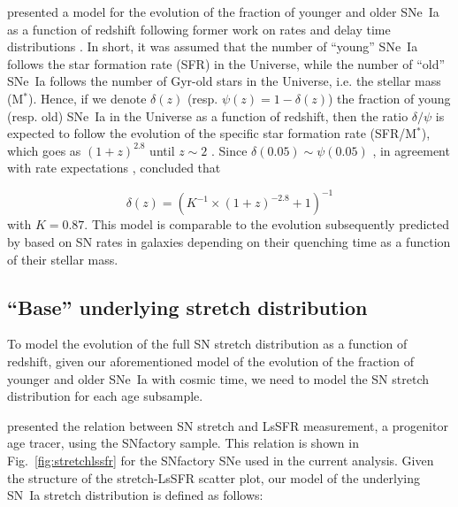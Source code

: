 \documentclass[]{aa}
\begin{document}
\cite{rigault2020} presented a model for the evolution of the fraction of
younger and older SNe~Ia as a function of redshift following former work on
rates and delay time distributions \citep[e.g.,][]{mannucci2005,
scannapieco2005, sullivan2006, aubourg2008, childress2014, maozmannucci2014}.
In short, it was assumed that the number of ``young'' SNe~Ia follows the star
formation rate (SFR) in the Universe, while the number of ``old'' SNe~Ia follows
the number of Gyr-old stars in the Universe, i.e. the stellar mass (M$^*$).
Hence, if we denote $\delta(z)$ (resp. $\psi(z) = 1-\delta(z)$) the fraction of
young (resp. old) SNe~Ia in the Universe as a function of redshift, then the
ratio $\delta/\psi$ is expected to follow the evolution of the specific star
formation rate (SFR/M$^*$), which goes as $(1+z)^{2.8}$ until $z\sim2$
\citep[e.g.,][]{tasca2015}. Since $\delta(0.05) \sim \psi(0.05)$
\citep{rigault2013, rigault2020, wiseman2020}, in agreement with rate
expectations \citep{mannucci2006, rodney2014}, \cite{rigault2020} concluded that

\begin{equation}
    \label{eq:delta}
    \delta(z) = \left( K^{-1} \times (1+z)^{-2.8} +1 \right)^{-1}
\end{equation}
with $K=0.87$. This model is comparable to the evolution subsequently
predicted by \cite{childress2014} based on SN rates in galaxies depending on
their quenching time as a function of their stellar mass.

\subsection{``Base'' underlying stretch distribution}
\label{sec:basemodel}

To model the evolution of the full SN stretch distribution as a function of
redshift, given our aforementioned model of the evolution of the fraction of
younger and older SNe~Ia with cosmic time, we need to model the SN stretch
distribution for each age subsample. 

\cite{rigault2020} presented the relation between SN stretch and LsSFR
measurement, a progenitor age tracer, using the SNfactory sample. This relation
is shown in Fig.~\ref{fig:stretchlssfr} for the SNfactory SNe used in the
current analysis. Given the structure of the stretch-LsSFR scatter plot, our
model of the underlying SN~Ia stretch distribution is defined as follows:
\end{document}
